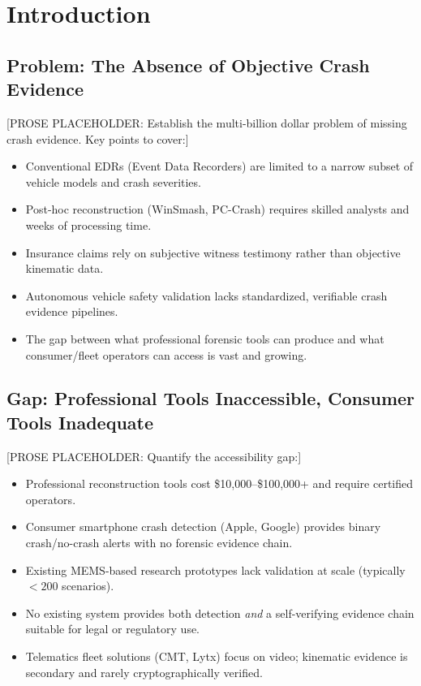 \documentclass[conference,twocolumn]{IEEEtran}
\begin{document}
\section{Introduction}

\subsection{Problem: The Absence of Objective Crash Evidence}

[PROSE PLACEHOLDER: Establish the multi-billion dollar problem of missing crash evidence. Key points to cover:]
\begin{itemize}
  \item Conventional EDRs (Event Data Recorders) are limited to a narrow subset of vehicle models and crash severities.
  \item Post-hoc reconstruction (WinSmash, PC-Crash) requires skilled analysts and weeks of processing time.
  \item Insurance claims rely on subjective witness testimony rather than objective kinematic data.
  \item Autonomous vehicle safety validation lacks standardized, verifiable crash evidence pipelines.
  \item The gap between what professional forensic tools can produce and what consumer/fleet operators can access is vast and growing.
\end{itemize}

\subsection{Gap: Professional Tools Inaccessible, Consumer Tools Inadequate}

[PROSE PLACEHOLDER: Quantify the accessibility gap:]
\begin{itemize}
  \item Professional reconstruction tools cost \$10,000--\$100,000+ and require certified operators.
  \item Consumer smartphone crash detection (Apple, Google) provides binary crash/no-crash alerts with no forensic evidence chain.
  \item Existing MEMS-based research prototypes lack validation at scale (typically $<200$ scenarios).
  \item No existing system provides both detection \emph{and} a self-verifying evidence chain suitable for legal or regulatory use.
  \item Telematics fleet solutions (CMT, Lytx) focus on video; kinematic evidence is secondary and rarely cryptographically verified.
\end{itemize}
\end{document}

